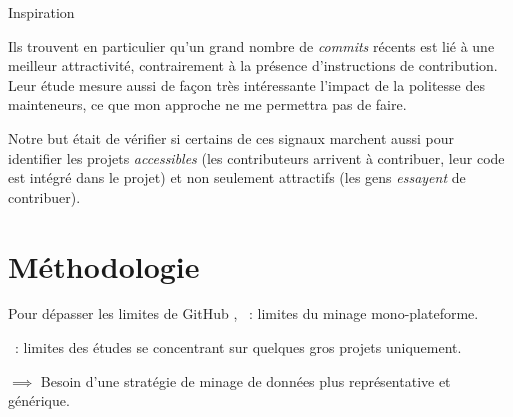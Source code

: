 \documentclass[usenames,dvipsnames,10pt]{beamer}
\newcommand{\mycite}[1]{%
    \citeauthor{#1} \citeyear{#1} \cite{#1}%
}
\begin{document}
\begin{frame}[fragile]{Inspiration}
{        Ils trouvent en particulier qu'un grand nombre de \emph{commits} récents
        est lié à une meilleur attractivité, contrairement à la présence
        d'instructions de contribution. Leur étude mesure aussi de façon très
        intéressante l'impact de la politesse des mainteneurs, ce que mon
        approche ne me permettra pas de faire.

        Notre but était de vérifier si certains de ces signaux marchent aussi
        pour identifier les projets \emph{accessibles} (les contributeurs
        arrivent à contribuer, leur code est intégré dans le projet) et non
        seulement attractifs (les gens \emph{essayent} de contribuer).
    }
\end{frame}

\section{Méthodologie}

\begin{frame}[fragile]{Pour dépasser les limites de GitHub}
    \mycite{mining-github-2014}, \mycite{penumbra-oss-2022} : limites du minage
    mono-plateforme.

    \mycite{barriers-2018} : limites des études se concentrant sur quelques gros
    projets uniquement.

    \bigskip

    $\implies$ Besoin d'une stratégie de minage de données plus représentative
    et générique.

    \begin{figure}
        
    \end{figure}

\end{frame}
\end{document}
